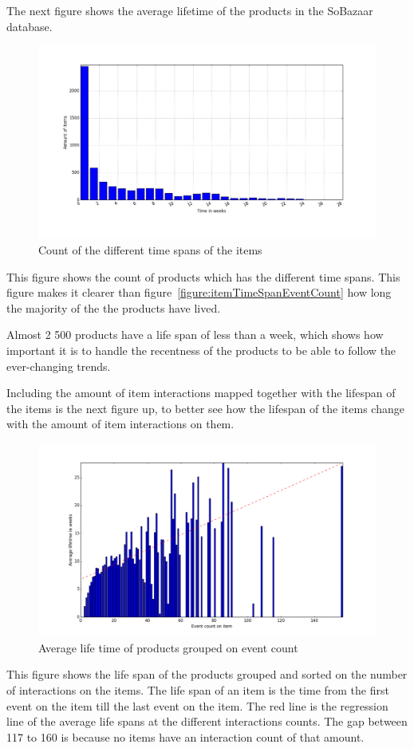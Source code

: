    The next figure shows the average lifetime of the products in the SoBazaar database.

    \begin{figure}[H]
        \includegraphics[width=5in]{image/itemTimespansdistribution.png}
        \centering
        \caption{Count of the different time spans of the items}
    \label{figure:itemLifes}
    \end{figure}
        This figure shows the count of products which has the different time spans.
        This figure makes it clearer than figure~\ref{figure:itemTimeSpanEventCount} how long the majority of the the products have lived.

        Almost 2 500 products have a life span of less than a week, which shows how important it is to handle the recentness of the products to be able to follow the ever-changing trends.

        Including the amount of item interactions mapped together with the lifespan of the items is the next figure up, to better see how the lifespan of the items change with the amount of item interactions on them.

    \begin{figure}[H]
        \includegraphics[width=5in]{image/avglifetimeoncount.png}
        \centering
        \caption{Average life time of products grouped on event count}
    \label{figure:averageLifetimBasedoncount}
    \end{figure}
        This figure shows the life span of the products grouped and sorted on the number of interactions on the items.
        The life span of an item is the time from the first event on the item till the last event on the item.
        The red line is the regression line of the average life spans at the different interactions counts.
        The gap between 117 to 160 is because no items have an interaction count of that amount.

